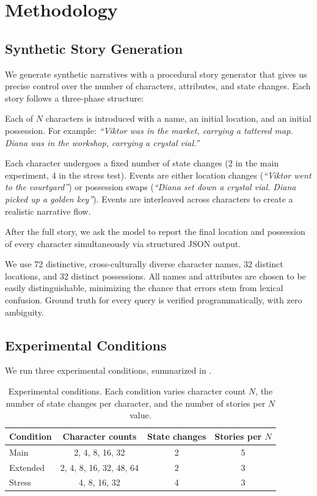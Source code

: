 \section{Methodology}
\label{sec:method}

\subsection{Synthetic Story Generation}
\label{sec:storygen}

We generate synthetic narratives with a procedural story generator that gives us precise control over the number of characters, attributes, and state changes.
Each story follows a three-phase structure:

Each of $N$ characters is introduced with a name, an initial location, and an initial possession.
For example: \emph{``Viktor was in the market, carrying a tattered map. Diana was in the workshop, carrying a crystal vial.''}

Each character undergoes a fixed number of state changes (2 in the main experiment, 4 in the stress test).
Events are either location changes (\emph{``Viktor went to the courtyard''}) or possession swaps (\emph{``Diana set down a crystal vial. Diana picked up a golden key''}).
Events are interleaved across characters to create a realistic narrative flow.

After the full story, we ask the model to report the final location and possession of every character simultaneously via structured JSON output.

We use 72 distinctive, cross-culturally diverse character names, 32 distinct locations, and 32 distinct possessions.
All names and attributes are chosen to be easily distinguishable, minimizing the chance that errors stem from lexical confusion.
Ground truth for every query is verified programmatically, with zero ambiguity.

\subsection{Experimental Conditions}

We run three experimental conditions, summarized in .

\begin{table}[t]
\centering
\caption{Experimental conditions. Each condition varies character count $N$, the number of state changes per character, and the number of stories per $N$ value.}
\label{tab:conditions}
\small
\begin{tabular}{@{}lccc@{}}
\toprule
\textbf{Condition} & \textbf{Character counts} & \textbf{State changes} & \textbf{Stories per $N$} \\
\midrule
Main & 2, 4, 8, 16, 32 & 2 & 5 \\
Extended & 2, 4, 8, 16, 32, 48, 64 & 2 & 3 \\
Stress & 4, 8, 16, 32 & 4 & 3 \\
\bottomrule
\end{tabular}
\end{table}


